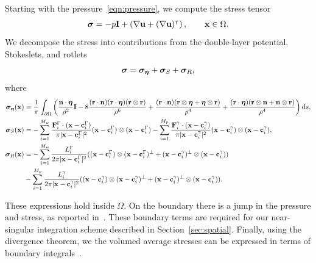 \documentclass[preprint, 10pt]{elsarticle}
\begin{document}
Starting with the pressure~\eqref{eqn:pressure}, we compute the stress
tensor
\begin{align*} 
{\boldsymbol\sigma} = -p \mathbf{I} + \left(\nabla {\mathbf{u}} + (\nabla{\mathbf{u}})^\intercal\right), \qquad
{\mathbf{x}}\in\Omega.
\end{align*}
We decompose the stress into contributions from the double-layer
potential, Stokeslets, and rotlets
\begin{align}
  \label{eqn:stress}
  {\boldsymbol\sigma} = {\boldsymbol\sigma}_{{\boldsymbol\eta}} + {\boldsymbol\sigma}_{S} + {\boldsymbol\sigma}_{R},
\end{align}
where
\begin{align*}
  {\boldsymbol\sigma}_{{\boldsymbol\eta}}({\mathbf{x}}) &= \frac{1}{\pi}\int_{\partial\Omega}\left( 
    \frac{{\mathbf{n}}\cdot{\boldsymbol\eta}}{\rho^2}\mathbf{I} 
    -8\frac{({\mathbf{r}}\cdot{\mathbf{n}})({\mathbf{r}}\cdot{\boldsymbol\eta})({\mathbf{r}}\otimes{\mathbf{r}})}{\rho^6} 
    +\frac{({\mathbf{r}}\cdot{\mathbf{n}})({\mathbf{r}}\otimes{\boldsymbol\eta} + {\boldsymbol\eta}\otimes{\mathbf{r}})}{\rho^4} 
+ \frac{({\mathbf{r}}\cdot{\boldsymbol\eta})({\mathbf{r}}\otimes{\mathbf{n}} +
{\mathbf{n}}\otimes{\mathbf{r}})}{\rho^4}\right)\text{d}s,\\
  {\boldsymbol\sigma}_S({\mathbf{x}}) &= -\sum_{i=1}^{M_w} 
    \frac{{\mathbf{F}}_i^\Gamma\cdot({\mathbf{x}} - {\mathbf{c}}_i^\Gamma)}{\pi|{\mathbf{x}}-{\mathbf{c}}_i^\Gamma|^2}
        ({\mathbf{x}} - {\mathbf{c}}_i^\Gamma)\otimes({\mathbf{x}} - {\mathbf{c}}_i^\Gamma)  -
    \sum_{i=1}^{M_p}
    \frac{{\mathbf{F}}_i^\gamma\cdot({\mathbf{x}} - {\mathbf{c}}_i^\gamma)}{\pi|{\mathbf{x}}-{\mathbf{c}}_i^\gamma|^2}
        ({\mathbf{x}}-{\mathbf{c}}_i^\gamma )\otimes({\mathbf{x}}-{\mathbf{c}}_i^\gamma),\\
{\boldsymbol\sigma}_R({\mathbf{x}}) &= -\sum_{i=1}^{M_w} \frac{L_i^\Gamma}{2\pi|{\mathbf{x}}-{\mathbf{c}}_i^\Gamma|^2}
(({\mathbf{x}}-{\mathbf{c}}_i^\Gamma)\otimes({\mathbf{x}}-{\mathbf{c}}_i^\Gamma)^\perp +
    ({\mathbf{x}}-{\mathbf{c}}_i^\gamma)^\perp\otimes({\mathbf{x}}-{\mathbf{c}}_i^\gamma))  \\
\qquad&-\sum_{i=1}^{M_p}
\frac{L_i^\gamma}{2\pi|{\mathbf{x}}-{\mathbf{c}}_i^\gamma|^2}
    (({\mathbf{x}}-{\mathbf{c}}_i^\gamma )\otimes({\mathbf{x}}-{\mathbf{c}}_i^\gamma)^\perp + 
    ({\mathbf{x}}-{\mathbf{c}}_i^\gamma)^\perp\otimes({\mathbf{x}}-{\mathbf{c}}_i^\gamma)).
\end{align*}

These expressions hold inside $\Omega$. On the boundary there is a jump
in the pressure and stress, as reported in~\cite{Quaife2014}.  These
boundary terms are required for our near-singular integration scheme
described in Section~\ref{sec:spatial}.  Finally, using the divergence
theorem, we the volumed average stresses can be expressed in terms of
boundary integrals~\cite{Pozrikidis1992}. 
		
\end{document}
